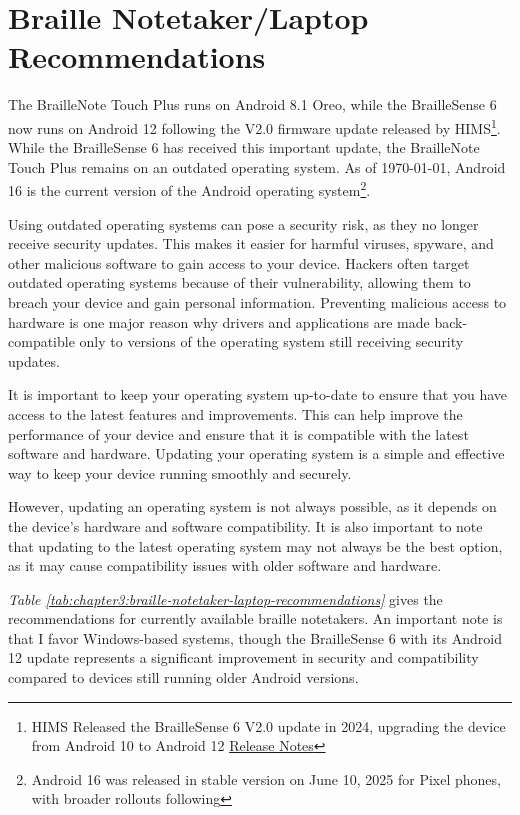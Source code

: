 \section{Braille Notetaker/Laptop Recommendations}\label{braille-notetakers-and-braille-laptop-computers-recommend}
The BrailleNote Touch Plus runs on Android 8.1 Oreo, while the BrailleSense 6 now runs on Android 12 following the V2.0 firmware update released by HIMS\footnote{HIMS Released the BrailleSense 6 V2.0 update in 2024, upgrading the device from Android 10 to Android 12 \href{https://www.himsintl.com/en/public_relations/media.php?bgu=view&idx=56}{Release Notes}}. While the BrailleSense 6 has received this important update, the BrailleNote Touch Plus remains on an outdated operating system. As of \today, Android 16 is the current version of the Android operating system\footnote{Android 16 was released in stable version on June 10, 2025 for Pixel phones, with broader rollouts following}.

Using outdated operating systems can pose a security risk, as they no longer receive security updates. This makes it easier for harmful viruses, spyware, and other malicious software to gain access to your device. Hackers often target outdated operating systems because of their vulnerability, allowing them to breach your device and gain personal information. Preventing malicious access to hardware is one major reason why drivers and applications are made back-compatible only to versions of the operating system still receiving security updates.

It is important to keep your operating system up-to-date to ensure that you have access to the latest features and improvements. This can help improve the performance of your device and ensure that it is compatible with the latest software and hardware. Updating your operating system is a simple and effective way to keep your device running smoothly and securely.

However, updating an operating system is not always possible, as it depends on the device's hardware and software compatibility. It is also important to note that updating to the latest operating system may not always be the best option, as it may cause compatibility issues with older software and hardware.

\emph{Table \ref{tab:chapter3:braille-notetaker-laptop-recommendations}} gives the recommendations for currently available braille notetakers. An important note is that I favor Windows-based systems, though the BrailleSense 6 with its Android 12 update represents a significant improvement in security and compatibility compared to devices still running older Android versions.

